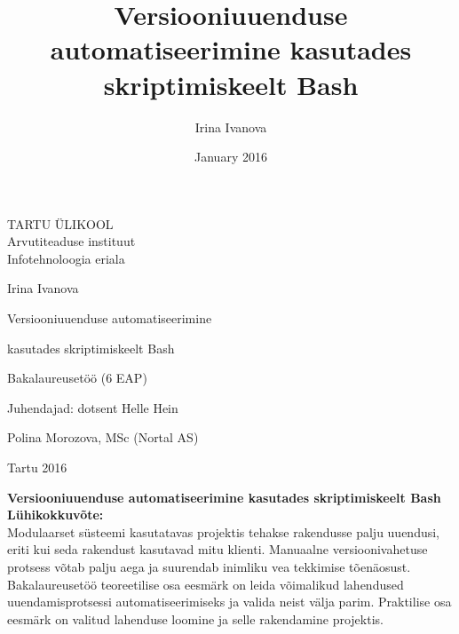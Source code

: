 \documentclass[12pt]{article}
\title{Versiooniuuenduse automatiseerimine kasutades skriptimiskeelt Bash}
\author{Irina Ivanova}
\date{January 2016}
\begin{document}
  \begin{titlepage}
    \begin{center}
      TARTU ÜLIKOOL\\
      Arvutiteaduse instituut\\
      Infotehnoloogia eriala
    \end{center}
      
    \vspace{5cm}
    
    \begin{center}  
      {\Large Irina Ivanova}
    \end{center}
    \begin{center}      
      {\huge Versiooniuuenduse automatiseerimine}
    \end{center}
    \begin{center}
      {\huge kasutades skriptimiskeelt Bash}
    \end{center}
    \begin{center}
      {\large Bakalaureusetöö (6 EAP)}
    \end{center}
      
    \vspace{4cm}
    \hspace{4.5cm}
    Juhendajad: dotsent Helle Hein
    
    \hspace{7cm}
    Polina Morozova, MSc (Nortal AS)
      
    \vspace{2.5cm}
    \begin{center}
      Tartu 2016
    \end{center}
  \end{titlepage}

  \newpage
  
  \noindent\textbf{Versiooniuuenduse automatiseerimine kasutades skriptimiskeelt Bash}\\
  
  \noindent\textbf{Lühikokkuvõte:}\\
  Modulaarset süsteemi kasutatavas projektis tehakse rakendusse palju uuendusi, eriti kui seda rakendust kasutavad mitu klienti. Manuaalne versioonivahetuse protsess võtab palju aega ja suurendab inimliku vea tekkimise tõenäosust. Bakalaureusetöö teoreetilise osa eesmärk on leida võimalikud lahendused uuendamisprotsessi automatiseerimiseks ja valida neist välja parim. Praktilise osa eesmärk on valitud lahenduse loomine ja selle rakendamine projektis.\\
  
\end{document}
